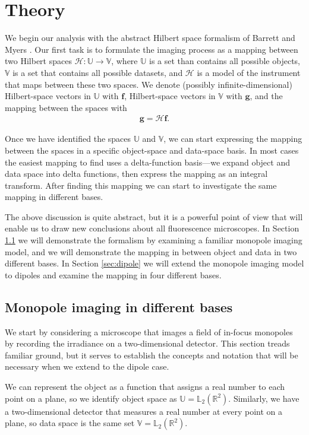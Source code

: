 \documentclass[]{osa-article}
\providecommand{\mb}[1]{\mathbf{#1}}
\providecommand{\mc}[1]{\mathcal{#1}}
\providecommand{\mbb}[1]{\mathbb{#1}}
\begin{document}
\section{Theory}\label{sec:theory}
We begin our analysis with the abstract Hilbert space formalism of Barrett and
Myers \cite{barrett2004}. Our first task is to formulate the imaging process as
a mapping between two Hilbert spaces $\mc{H}: \mbb{U} \rightarrow \mbb{V}$, where
$\mbb{U}$ is a set than contains all possible objects, $\mbb{V}$ is a set that
contains all possible datasets, and $\mc{H}$ is a model of the instrument that
maps between these two spaces. We denote (possibly infinite-dimensional)
Hilbert-space vectors in $\mbb{U}$ with $\mb{f}$, Hilbert-space vectors in
$\mbb{V}$ with $\mb{g}$, and the mapping between the spaces with
\begin{align}
  \mb{g} = \mc{H}\mb{f}.
\end{align}

Once we have identified the spaces $\mbb{U}$ and $\mbb{V}$, we can start
expressing the mapping between the spaces in a specific object-space and
data-space basis. In most cases the easiest mapping to find uses a
delta-function basis---we expand object and data space into delta functions,
then express the mapping as an integral transform. After finding this mapping we
can start to investigate the same mapping in different bases.

The above discussion is quite abstract, but it is a powerful point of view that
will enable us to draw new conclusions about all fluorescence microscopes. In
Section \ref{sec:monopole} we will demonstrate the formalism by examining a
familiar monopole imaging model, and we will demonstrate the mapping in between
object and data in two different bases. In Section \ref{sec:dipole} we will
extend the monopole imaging model to dipoles and examine the mapping in four
different bases.

\subsection{Monopole imaging in different bases}\label{sec:monopole}
We start by considering a microscope that images a field of in-focus monopoles
by recording the irradiance on a two-dimensional detector. This section treads
familiar ground, but it serves to establish the concepts and notation that will
be necessary when we extend to the dipole case.

We can represent the object as a function that assigns a real number to each
point on a plane, so we identify object space as
$\mbb{U} = \mbb{L}_2(\mbb{R}^2)$. Similarly, we have a two-dimensional detector
that measures a real number at every point on a plane, so data space is the same
set $\mbb{V} = \mbb{L}_2(\mbb{R}^2)$.
\end{document}
